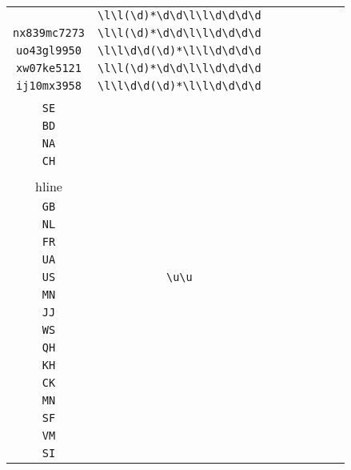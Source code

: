\begin{longtable}{cccccccc}
\begin{tabular}{ll}
    \verb|wn44ge8134| & \verb|\l\l(\d)*\d\d\l\l\d\d\d\d|\\
\verb|nx839mc7273| & \verb|\l\l(\d)*\d\d\l\l\d\d\d\d|\\
\verb|uo43gl9950| & \verb|\l\l\d\d(\d)*\l\l\d\d\d\d|\\
\verb|xw07ke5121| & \verb|\l\l(\d)*\d\d\l\l\d\d\d\d|\\
\verb|ij10mx3958| & \verb|\l\l\d\d(\d)*\l\l\d\d\d\d|
\end{tabular}
\\\midrule 
\begin{tabular}{l}
    \verb|DE|\\
\verb|SE|\\
\verb|BD|\\
\verb|NA|\\
\verb|CH|\\
\\hline\\
\verb|GB|\\
\verb|NL|\\
\verb|FR|\\
\verb|UA|\\
\verb|US|
\end{tabular}

&
\verb|\u\u|
&

\begin{tabular}{l}
    \verb|\u\u|\\
\verb|MN|\\
\verb|JJ|\\
\verb|WS|\\
\verb|QH|\\
\verb|KH|
\end{tabular}

&

\begin{tabular}{l}
    \verb|\u\u|\\
\verb|CK|\\
\verb|MN|\\
\verb|SF|\\
\verb|VM|\\
\verb|SI|
\end{tabular}

&


\end{longtable}
